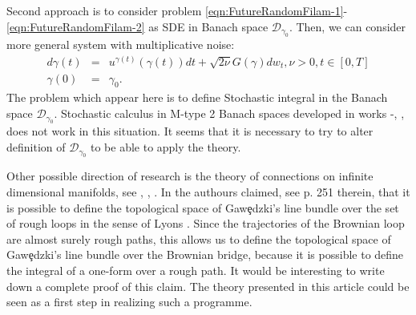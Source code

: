 \documentclass[11pt,a4paper,leqno]{amsart}%
\theoremstyle{plain}
\theoremstyle{remark}
\theoremstyle{plain}
\numberwithin{equation}{section}
\begin{document}
Second approach is to consider problem
\eqref{eqn:FutureRandomFilam-1}-\eqref{eqn:FutureRandomFilam-2} as
SDE in Banach space $\mathcal{D}_{\gamma_0}$. Then, we can consider more
general system with multiplicative noise:
\begin{eqnarray}
d\gamma(t) &=& u^{\gamma(t)}(\gamma(t))dt+\sqrt{2\nu}G(\gamma)dw_t,\nu>0,t\in [0,T] \label{eqn:FutureRandomFilam-1b}\\
\gamma(0) &=& \gamma_0.\label{eqn:FutureRandomFilam-2b}
\end{eqnarray}
The problem which appear here is to define Stochastic integral in
the Banach space $\mathcal{D}_{\gamma_0}$. Stochastic calculus in M-type 2
Banach spaces developed in works
\cite{[Dettweiler-85]}-\cite{[Dettweiler-91]}, \cite{[Brz-95]},
\cite{[Brz-03]} does not work in this situation. It seems that it
is necessary to try to alter definition of $\mathcal{D}_{\gamma_0}$ to be
able to apply the theory.

Other possible direction of research is the theory of connections
on infinite dimensional manifolds, see \cite{[Gawedzki-1988]},
\cite{[Brylinski-1992]}, \cite{[Leandre-1999]}. In
\cite{[Brz-Leandre-2000]} the authours claimed, see p. 251
therein, that it is possible to define the topological space of
Gaw{\c e}dzki's \cite{[Gawedzki-1988]} line bundle over the set of
rough loops in the sense of Lyons \cite{[Lyons-1998]}. Since the
trajectories of the Brownian loop are almost surely rough paths,
this allows us to define the topological space of Gaw{\c e}dzki's
line bundle over the Brownian bridge, because it is possible to
define the integral of a one-form over a rough path. It would be
interesting to write down a complete proof of this claim. The
theory presented in this article could be seen as a first step in
realizing such a programme.
\end{document}
